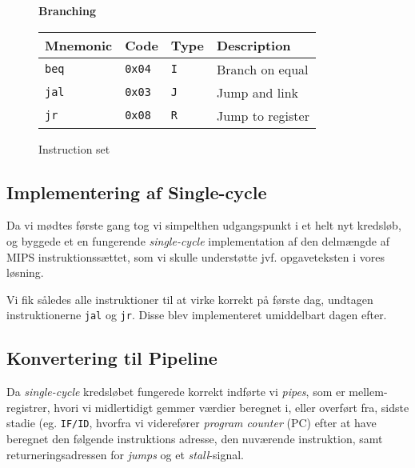 \documentclass[11pt,twoside,a4paper]{article}
\begin{document}
\begin{figure}[H]
\begin{multicols}{2}
        \vspace{0.26in} %
        \textbf{Branching} \\
        \vspace{0.15in}
        \begin{tabular}{|l|l|l|l|}
                \hline
                \scriptsize {\bf Mnemonic} &
                \scriptsize {\bf Code} &
                \scriptsize {\bf Type} &
                \scriptsize {\bf Description} \\
                \hline {\tt beq} & {\tt 0x04} & {\tt I} & \scriptsize Branch on equal \\
                \hline {\tt jal} & {\tt 0x03} & {\tt J} & \scriptsize Jump and link \\
                \hline {\tt jr} & {\tt 0x08} & {\tt R} & \scriptsize Jump to register \\
                \hline
        \end{tabular}

        \end{multicols}
        \caption{Instruction set}
        \label{fig:instruction-set}
\end{figure}

\subsection{Implementering af Single-cycle}
Da vi mødtes første gang tog vi simpelthen udgangspunkt i et helt nyt
kredsløb, og byggede et en fungerende {\it single-cycle} implementation af
den delmængde af MIPS instruktionssættet, som vi skulle understøtte jvf.
opgaveteksten i vores løsning.

Vi fik således alle instruktioner til at virke korrekt på første dag, undtagen
instruktionerne {\tt jal} og {\tt jr}. Disse blev implementeret umiddelbart
dagen efter.

\subsection{Konvertering til Pipeline}
Da {\it single-cycle} kredsløbet fungerede korrekt indførte vi {\it pipes},
som er mellem-registrer, hvori vi midlertidigt gemmer værdier beregnet i,
eller overført fra, sidste stadie (eg. {\tt IF/ID}, hvorfra vi viderefører
{\it program counter} (PC) efter at have beregnet den følgende instruktions
adresse, den nuværende instruktion, samt returneringsadressen for {\it jumps}
og et {\it stall}-signal.   
\end{document}
